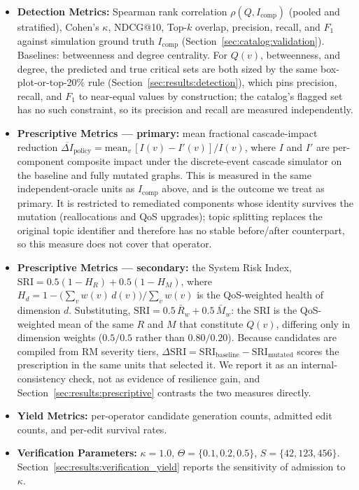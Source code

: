 \begin{itemize}
    \item \textbf{Detection Metrics:} Spearman rank correlation $\rho(Q, I_{\text{comp}})$ (pooled and stratified), Cohen's $\kappa$, NDCG@10, Top-$k$ overlap, precision, recall, and $F_1$ against simulation ground truth $I_{\text{comp}}$ (Section~\ref{sec:catalog:validation}). Baselines: betweenness and degree centrality. For $Q(v)$, betweenness, and degree, the predicted and true critical sets are both sized by the same box-plot-or-top-20\% rule (Section~\ref{sec:results:detection}), which pins precision, recall, and $F_1$ to near-equal values by construction; the catalog's flagged set has no such constraint, so its precision and recall are measured independently.
    \item \textbf{Prescriptive Metrics --- primary:} mean fractional cascade-impact reduction $\overline{\Delta I}_{\text{policy}} = \mathrm{mean}_v\,[I(v) - I'(v)]/I(v)$, where $I$ and $I'$ are per-component composite impact under the discrete-event cascade simulator on the baseline and fully mutated graphs. This is measured in the same independent-oracle units as $I_{\text{comp}}$ above, and is the outcome we treat as primary. It is restricted to remediated components whose identity survives the mutation (reallocations and QoS upgrades); topic splitting replaces the original topic identifier and therefore has no stable before/after counterpart, so this measure does not cover that operator.
    \item \textbf{Prescriptive Metrics --- secondary:} the System Risk Index, $\mathrm{SRI} = 0.5(1-H_R) + 0.5(1-H_M)$, where $H_d = 1 - \big(\sum_v w(v)\,d(v)\big)/\sum_v w(v)$ is the QoS-weighted health of dimension $d$. Substituting, $\mathrm{SRI} = 0.5\,\bar{R}_w + 0.5\,\bar{M}_w$: the SRI is the QoS-weighted mean of the same $R$ and $M$ that constitute $Q(v)$, differing only in dimension weights ($0.5/0.5$ rather than $0.80/0.20$). Because candidates are compiled from RM severity tiers, $\Delta\mathrm{SRI} = \mathrm{SRI}_{\text{baseline}} - \mathrm{SRI}_{\text{mutated}}$ scores the prescription in the same units that selected it. We report it as an internal-consistency check, not as evidence of resilience gain, and Section~\ref{sec:results:prescriptive} contrasts the two measures directly.
    \item \textbf{Yield Metrics:} per-operator candidate generation counts, admitted edit counts, and per-edit survival rates.
    \item \textbf{Verification Parameters:} $\kappa = 1.0$, $\Theta = \{0.1, 0.2, 0.5\}$, $S = \{42, 123, 456\}$. Section~\ref{sec:results:verification_yield} reports the sensitivity of admission to $\kappa$.

\end{itemize}
